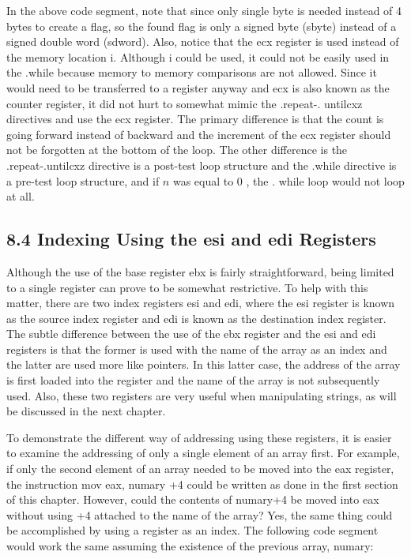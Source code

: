 \documentclass[10pt]{book}
\begin{document}
In the above code segment, note that since only single byte is needed instead of 4 bytes to create a flag, so the found flag is only a signed byte (sbyte) instead of a signed double word (sdword). Also, notice that the ecx register is used instead of the memory location i. Although i could be used, it could not be easily used in the .while because memory to memory comparisons are not allowed. Since it would need to be transferred to a register anyway and ecx is also known as the counter register, it did not hurt to somewhat mimic the .repeat-. untilcxz directives and use the ecx register. The primary difference is that the count is going forward instead of backward and the increment of the ecx register should not be forgotten at the bottom of the loop. The other difference is the .repeat-.untilcxz directive is a post-test loop structure and the .while directive is a pre-test loop structure, and if $n$ was equal to 0 , the . while loop would not loop at all.

\subsection*{8.4 Indexing Using the esi and edi Registers}
Although the use of the base register ebx is fairly straightforward, being limited to a single register can prove to be somewhat restrictive. To help with this matter, there are two index registers esi and edi, where the esi register is known as the source index register and edi is known as the destination index register. The subtle difference between the use of the ebx register and the esi and edi registers is that the former is used with the name of the array as an index and the latter are used more like pointers. In this latter case, the address of the array is first loaded into the register and the name of the array is not subsequently used. Also, these two registers are very useful when manipulating strings, as will be discussed in the next chapter.


To demonstrate the different way of addressing using these registers, it is easier to examine the addressing of only a single element of an array first. For example, if only the second element of an array needed to be moved into the eax register, the instruction mov eax, numary +4 could be written as done in the first section of this chapter. However, could the contents of numary+4 be moved into eax without using +4 attached to the name of the array? Yes, the same thing could be accomplished by using a register as an index. The following code segment would work the same assuming the existence of the previous array, numary:
\end{document}

